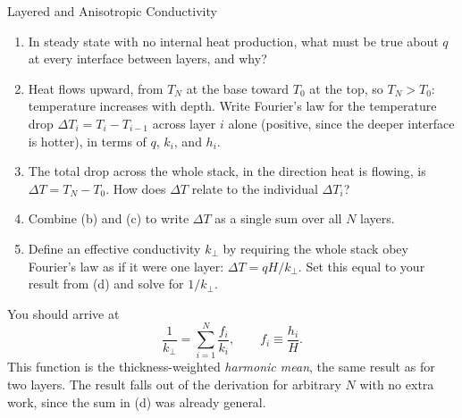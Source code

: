 \begin{activity}{Layered and Anisotropic Conductivity}
\begin{questions}
\begin{center}
    \end{center}

    \begin{enumerate}[label=(\alph*)]
        \item In steady state with no internal heat production, what must be true about $q$ at every interface between layers, and why?
        \answerbox[1.5cm]

        \item Heat flows upward, from $T_N$ at the base toward $T_0$ at the top, so $T_N > T_0$: temperature increases with depth. Write Fourier's law for the temperature drop $\Delta T_i = T_i - T_{i-1}$ across layer $i$ alone (positive, since the deeper interface is hotter), in terms of $q$, $k_i$, and $h_i$.
        \answerbox[1.5cm]

        \item The total drop across the whole stack, in the direction heat is flowing, is $\Delta T = T_N - T_0$. How does $\Delta T$ relate to the individual $\Delta T_i$?
        \answerbox[1.5cm]

        \item Combine (b) and (c) to write $\Delta T$ as a single sum over all $N$ layers.
        \answerbox[2cm]

        \item Define an effective conductivity $k_\perp$ by requiring the whole stack obey Fourier's law as if it were one layer: $\Delta T = qH/k_\perp$. Set this equal to your result from (d) and solve for $1/k_\perp$.
        \answerbox[2.5cm]
    \end{enumerate}

    You should arrive at
    \begin{equation}
        \frac{1}{k_\perp} = \sum_{i=1}^N \frac{f_i}{k_i}, \qquad f_i \equiv \frac{h_i}{H}.
    \end{equation}
    This function is the thickness-weighted \emph{harmonic mean}, the same result as for two layers. The result falls out of the derivation for arbitrary $N$ with no extra work, since the sum in (d) was already general.


\end{questions}
\end{activity}
